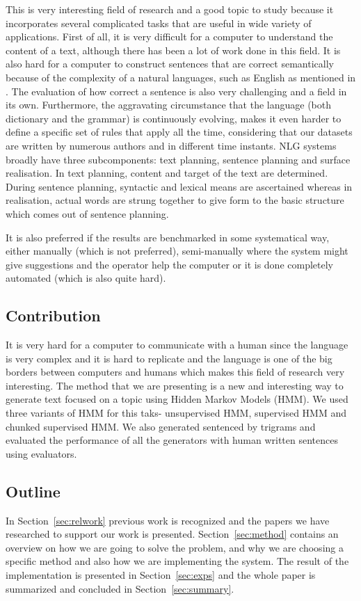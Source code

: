 \documentclass[a4paper,12pt]{article}
\begin{document}
This is very interesting field of research and a good topic to study because it
incorporates several complicated tasks that are useful in wide variety of
applications. First of all, it is very difficult for a computer to understand
the content of a text, although there has been a lot of work done in this field. 
It is also hard for a computer to construct sentences that are correct
semantically because of the complexity of a natural languages, such as English
as mentioned in \cite{nlgScratch}. The evaluation of how correct a sentence is 
also very challenging and a field in its own. Furthermore, the 
aggravating circumstance that the language (both dictionary and the grammar)
is continuously evolving, makes it even harder to define a specific set of rules 
that apply all the time, considering that our datasets are written by numerous
authors and in different time instants. NLG systems broadly have three
subcomponents: text planning, sentence planning and surface realisation.
In text planning, content and target of the text are determined. During sentence
planning, syntactic and lexical means are ascertained whereas in realisation, 
actual words are strung together to give form to the basic structure which comes out
of sentence planning. 

It is also preferred if the results are benchmarked in some systematical way,
either manually (which is not preferred), semi-manually where the system might
give suggestions and the operator help the computer or it is done completely
automated (which is also quite hard).


\subsection{Contribution}
It is very hard for a computer to communicate with a human since the language is
very complex and it is hard to replicate and the language is one of the big
borders between computers and humans which makes this field of research very
interesting. The method that we are presenting is a new and interesting way to
generate text focused on a topic using Hidden Markov Models (HMM). We used
three variants of HMM for this taks- unsupervised HMM, supervised HMM and 
chunked supervised HMM. We also generated sentenced by trigrams and evaluated
the performance of all the generators with human written sentences using evaluators.

\subsection{Outline}
In Section~\ref{sec:relwork} previous work is recognized and the papers we have
researched to support our work is presented. Section~\ref{sec:method} contains
an overview on how we are going to solve the problem, and why we are choosing a
specific method and also how we are implementing the system. The result of the
implementation is presented in Section~\ref{sec:exps} and the whole paper is
summarized and concluded in Section~\ref{sec:summary}.
\end{document}
